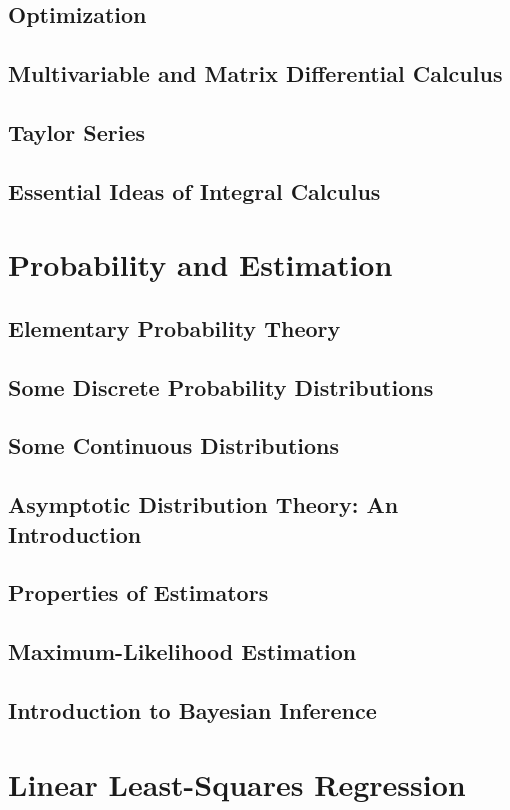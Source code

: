\documentclass[a4paper,11pt]{article}
\begin{document}
\subsection{Optimization}
\subsection{Multivariable and Matrix Differential Calculus}
\subsection{Taylor Series}
\subsection{Essential Ideas of Integral Calculus}
\section{Probability and Estimation}
\subsection{Elementary Probability Theory}
\subsection{Some Discrete Probability Distributions}
\subsection{Some Continuous Distributions}
\subsection{Asymptotic Distribution Theory: An Introduction}
\subsection{Properties of Estimators}
\subsection{Maximum-Likelihood Estimation}
\subsection{Introduction to Bayesian Inference}
\section{Linear Least-Squares Regression}
\end{document}
